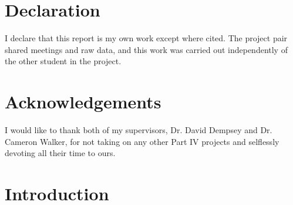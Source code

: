 \documentclass[a4paper, 12pt]{article}
\begin{document}
\newpage
{}
\section*{Declaration}
I declare that this report is my own work except where cited. The project pair shared meetings and raw data, and this work was carried out independently of the other student in the project.

\section*{Acknowledgements}
I would like to thank both of my supervisors, Dr. David Dempsey and Dr. Cameron Walker, for not taking on any other Part IV projects and selflessly devoting all their time to ours.

\newpage
{}

\begin{multicols}{2}
\begin{spacing}{0}
\setcounter{tocdepth}{2}
\tableofcontents
\end{spacing}
\end{multicols}

\newpage
{}
\setcounter{page}{1}
\pagestyle{fancy}

\section{Introduction}
\end{document}
